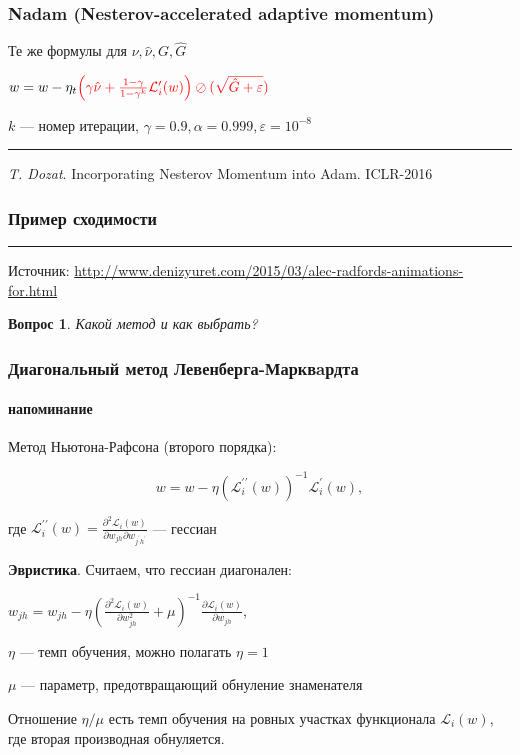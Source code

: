 \documentclass[fullscreen=true, bookmarks=true, hyperref={pdfencoding=unicode}]{beamer}
\newtheorem*{question}{Вопрос}
\begin{document}
\begin{frame}[t]
  \frametitle{Nadam (Nesterov-accelerated adaptive momentum)}

  Те же формулы для $\nu, \hat\nu, G, \hat G$

  $ w = w - {\eta_t}\color{red}{\left(\gamma\hat\nu + \frac{1-\gamma}{1-\gamma^k}\mathcal{L}_i^\prime(w) \right)} \oslash (\sqrt{\hat G + \varepsilon})
  $

  $k$ — номер итерации, $\gamma = 0.9, \alpha = 0.999, \varepsilon = 10^{-8}$

  \noindent\rule{8cm}{0.4pt}

  {\it T. Dozat}. Incorporating Nesterov Momentum into Adam. ICLR-2016
\end{frame}


\begin{frame}
  \frametitle{Пример сходимости}
  \begin{center}
  \end{center}

  \noindent\rule{8cm}{0.4pt}

   Источник: \href{http://www.denizyuret.com/2015/03/alec-radfords-animations-for.html}{http://www.denizyuret.com/2015/03/alec-radfords-animations-for.html}
\end{frame}


\begin{frame}
    \begin{question}
    Какой метод и как выбрать?
    \end{question}
\end{frame}


\begin{frame}
  \frametitle{Диагональный метод Левенберга-Марквaрдта}
  \framesubtitle{напоминание}
  Метод Ньютона-Рафсона (второго порядка):

  $$ w = w - \eta(\mathcal{L}^{\prime\prime}_i(w))^{-1} \mathcal{L}^{\prime}_i(w),$$

  где $\mathcal{L}^{\prime\prime}_i(w) = \frac{\partial^2 \mathcal{L}_i(w)}{\partial w_{jh} \partial w_{j^\prime h^\prime}}$ — гессиан

  {\bf Эвристика}. Считаем, что гессиан диагонален:

    $w_{jh} = w_{jh} - \eta \left(\frac{\partial^2 \mathcal{L}_i(w)}{\partial w^2_{jh}} + \mu \right)^{-1} \frac{\partial \mathcal{L}_i(w)}{\partial w_{jh}}$,

    $\eta$ — темп обучения, можно полагать $\eta = 1$

    $\mu$ — параметр, предотвращающий обнуление знаменателя

    Отношение $\eta/\mu$ есть темп обучения на ровных участках функционала $\mathcal{L}_i(w)$, где вторая производная обнуляется.
\end{frame}
\end{document}
